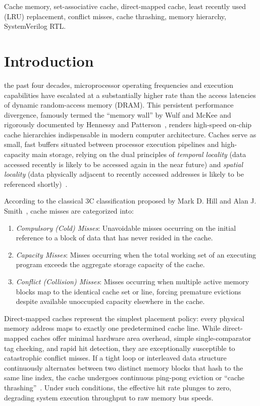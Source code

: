 \documentclass[conference]{IEEEtran}
\begin{document}
\begin{IEEEkeywords}
Cache memory, set-associative cache, direct-mapped cache, least recently used (LRU) replacement, conflict misses, cache thrashing, memory hierarchy, SystemVerilog RTL.
\end{IEEEkeywords}

\section{Introduction}
 the past four decades, microprocessor operating frequencies and execution capabilities have escalated at a substantially higher rate than the access latencies of dynamic random-access memory (DRAM). This persistent performance divergence, famously termed the ``memory wall'' by Wulf and McKee and rigorously documented by Hennessy and Patterson~\cite{hennessy2017computer}, renders high-speed on-chip cache hierarchies indispensable in modern computer architecture. Caches serve as small, fast buffers situated between processor execution pipelines and high-capacity main storage, relying on the dual principles of \textit{temporal locality} (data accessed recently is likely to be accessed again in the near future) and \textit{spatial locality} (data physically adjacent to recently accessed addresses is likely to be referenced shortly)~\cite{smith1982cache}.

According to the classical 3C classification proposed by Mark D. Hill and Alan J. Smith~\cite{hill1989evaluating}, cache misses are categorized into:
\begin{enumerate}
    \item \textit{Compulsory (Cold) Misses}: Unavoidable misses occurring on the initial reference to a block of data that has never resided in the cache.
    \item \textit{Capacity Misses}: Misses occurring when the total working set of an executing program exceeds the aggregate storage capacity of the cache.
    \item \textit{Conflict (Collision) Misses}: Misses occurring when multiple active memory blocks map to the identical cache set or line, forcing premature evictions despite available unoccupied capacity elsewhere in the cache.
\end{enumerate}

Direct-mapped caches represent the simplest placement policy: every physical memory address maps to exactly one predetermined cache line. While direct-mapped caches offer minimal hardware area overhead, simple single-comparator tag checking, and rapid hit detection, they are exceptionally susceptible to catastrophic conflict misses. If a tight loop or interleaved data structure continuously alternates between two distinct memory blocks that hash to the same line index, the cache undergoes continuous ping-pong eviction or ``cache thrashing''~\cite{jouppi1990improving, patterson2020riscv}. Under such conditions, the effective hit rate plunges to zero, degrading system execution throughput to raw memory bus speeds.
\end{document}
